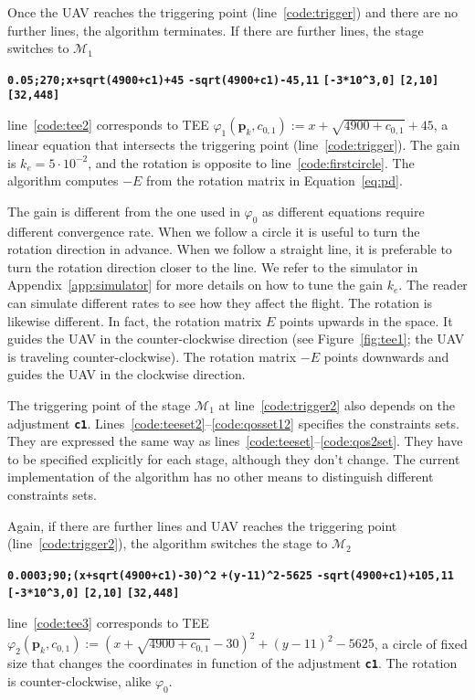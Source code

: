 \documentclass[letterpaper,10pt,conference]{ieeeconf}
\theoremstyle{definition}
\begin{document}
Once the UAV reaches the triggering point (line~\ref{code:trigger}) and there are no further lines, the algorithm terminates. If there are further lines, the stage switches to $\mathcal{M}_1$
\begin{algorithmic}[1]
  \State\textbf{\texttt{0.05;270;x+sqrt(4900+c1)+45}}\label{code:tee2}
  \State\textbf{\texttt{-sqrt(4900+c1)-45,11}}\label{code:trigger2}
  \State\textbf{\texttt{[-3*10\^{}3,0]}}\label{code:teeset2}
  \State\textbf{\texttt{[2,10]}}
  \State\textbf{\texttt{[32,448]}}\label{code:qosset12}
\end{algorithmic}
line~\ref{code:tee2} corresponds to TEE $\varphi_1(\mathbf{p}_k,c_{0,1}):=x+\sqrt{4900+c_{0,1}}+45$, a linear equation that intersects the triggering point (line~\ref{code:trigger}). The gain is $k_e=5\cdot 10^{-2}$, and the rotation is opposite to line~\ref{code:firstcircle}. The algorithm computes $-E$ from the rotation matrix in Equation~\ref{eq:pd}. 

The gain is different from the one used in $\varphi_0$ as different equations require different convergence rate. When we follow a circle it is useful to turn the rotation direction in advance. When we follow a straight line, it is preferable to turn the rotation direction closer to the line. We refer to the simulator in Appendix~\ref{app:simulator} for more details on how to tune the gain $k_e$. The reader can simulate different rates to see how they affect the flight. The rotation is likewise different. In fact, the rotation matrix $E$ points upwards in the space. It guides the UAV in the counter-clockwise direction (see Figure~\ref{fig:tee1}; the UAV is traveling counter-clockwise). The rotation matrix $-E$ points downwards and guides the UAV in the clockwise direction.

The triggering point of the stage $\mathcal{M}_1$ at line~\ref{code:trigger2} also depends on the adjustment {\tt\textbf{c1}}. Lines~\ref{code:teeset2}--\ref{code:qosset12} specifies the constraints sets. They are expressed the same way as lines~\ref{code:teeset}--\ref{code:qos2set}. They have to be specified explicitly for each stage, although they don't change. The current implementation of the algorithm has no other means to distinguish different constraints sets. 

Again, if there are further lines and UAV reaches the triggering point (line~\ref{code:trigger2}), the algorithm switches the stage to $\mathcal{M}_2$
\begin{algorithmic}[1]
  \State\textbf{\texttt{0.0003;90;(x+sqrt(4900+c1)-30)\^{}2}}
  \textbf{\texttt{\hspace*{14ex}+(y-11)\^{}2-5625}}\label{code:tee3}
  \State\textbf{\texttt{-sqrt(4900+c1)+105,11}}
  \State\textbf{\texttt{[-3*10\^{}3,0]}}
  \State\textbf{\texttt{[2,10]}}
  \State\textbf{\texttt{[32,448]}}\label{code:qosset32}
\end{algorithmic}
line~\ref{code:tee3} corresponds to TEE $\varphi_2(\mathbf{p}_k,c_{0,1}):=(x+\sqrt{4900+c_{0,1}}-30)^2+(y-11)^2-5625$, a circle of fixed size that changes the coordinates in function of the adjustment {\tt\textbf{c1}}. The rotation is counter-clockwise, alike $\varphi_0$.
\end{document}
